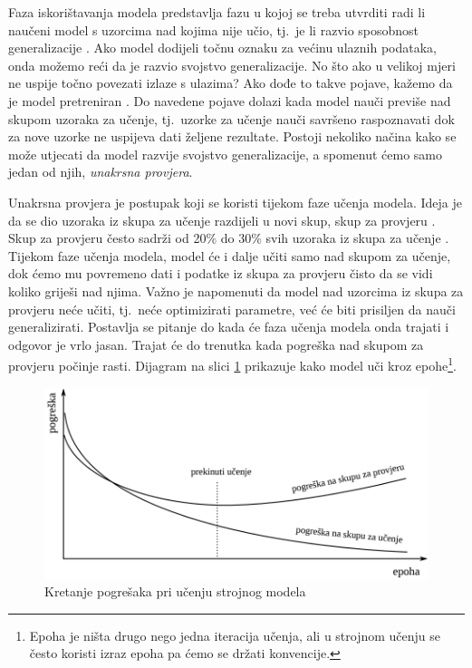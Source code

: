 \documentclass[times, utf8, zavrsni]{fer}
\begin{document}
Faza iskorištavanja modela predstavlja fazu u kojoj se treba utvrditi radi li naučeni model s uzorcima nad kojima nije učio, tj.\ je li razvio sposobnost generalizacije . Ako model dodijeli točnu oznaku za većinu ulaznih podataka, onda možemo reći da je razvio svojstvo generalizacije. No što ako u velikoj mjeri ne uspije točno povezati izlaze s ulazima? Ako dođe to takve pojave, kažemo da je model pretreniran . Do navedene pojave dolazi kada model nauči previše nad skupom uzoraka za učenje, tj.\ uzorke za učenje nauči savršeno raspoznavati dok za nove uzorke ne uspijeva dati željene rezultate. Postoji nekoliko načina kako se može utjecati da model razvije svojstvo generalizacije, a spomenut ćemo samo jedan od njih, \textit{unakrsna provjera}.

Unakrsna provjera  je postupak koji se koristi tijekom faze učenja modela. Ideja je da se dio uzoraka iz skupa za učenje razdijeli u novi skup, skup za provjeru . Skup za provjeru često sadrži od 20\% do 30\% svih uzoraka iz skupa za učenje \citep{cupicML}. Tijekom faze učenja modela, model će i dalje učiti samo nad skupom za učenje, dok ćemo mu povremeno dati i podatke iz skupa za provjeru čisto da se vidi koliko griješi nad njima. Važno je napomenuti da model nad uzorcima iz skupa za provjeru neće učiti, tj.\ neće optimizirati parametre, već će biti prisiljen da nauči generalizirati. Postavlja se pitanje do kada će faza učenja modela onda trajati i odgovor je vrlo jasan. Trajat će do trenutka kada pogreška nad skupom za provjeru počinje rasti. Dijagram na slici \ref{fig:cross-validation} prikazuje kako model uči kroz epohe\footnote{Epoha je ništa drugo nego jedna iteracija učenja, ali u strojnom učenju se često koristi izraz epoha pa ćemo se držati konvencije.}.

\begin{figure}[H]
    \centering
    \includegraphics[scale=0.5]{img/cross-validation.png}
    \caption[Caption for LOF]{Kretanje pogrešaka pri učenju strojnog modela\footnotemark}
    \label{fig:cross-validation}
\end{figure}
\end{document}
